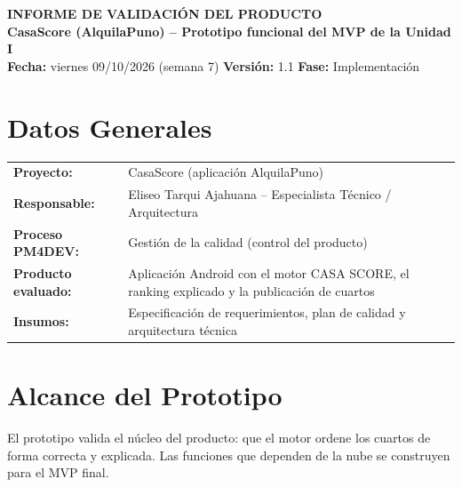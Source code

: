 \documentclass[11pt,a4paper]{article}
\begin{document}
\begin{center}
    {\Large \textbf{\textcolor{AzulUNA}{INFORME DE VALIDACIÓN DEL PRODUCTO}}}\\[3pt]
    {\normalsize \textbf{CasaScore (AlquilaPuno) -- Prototipo funcional del MVP de la Unidad I}}\\[4pt]
    \footnotesize \textbf{Fecha:} viernes 09/10/2026 (semana 7) \quad \textbar\quad \textbf{Versión:} 1.1 \quad \textbar\quad \textbf{Fase:} Implementación
\end{center}

\vspace{0.1cm}

\section{Datos Generales}
\noindent\begin{tabularx}{\textwidth}{@{}P{4.2cm} L@{}}
\toprule
\textbf{Proyecto:} & CasaScore (aplicación AlquilaPuno) \\
\textbf{Responsable:} & Eliseo Tarqui Ajahuana -- Especialista Técnico / Arquitectura \\
\textbf{Proceso PM4DEV:} & Gestión de la calidad (control del producto) \\
\textbf{Producto evaluado:} & Aplicación Android con el motor CASA SCORE, el ranking explicado y la publicación de cuartos \\
\textbf{Insumos:} & Especificación de requerimientos, plan de calidad y arquitectura técnica \\
\bottomrule
\end{tabularx}

\section{Alcance del Prototipo}
El prototipo valida el núcleo del producto: que el motor ordene los cuartos de forma correcta y explicada. Las funciones que dependen de la nube se construyen para el MVP final.
\end{document}
